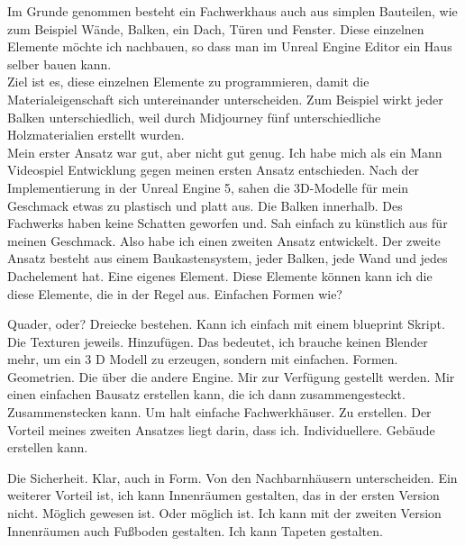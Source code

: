 \documentclass[10pt,a4paper,bibliography=totocnumbered,listof=totocnumbered]{scrartcl}
\begin{document}
Im Grunde genommen besteht ein Fachwerkhaus auch aus simplen Bauteilen, wie zum Beispiel Wände, Balken, ein Dach, Türen und Fenster. Diese einzelnen Elemente möchte ich nachbauen, so dass man im Unreal Engine Editor ein Haus selber bauen kann.
\\
Ziel ist es, diese einzelnen Elemente zu programmieren, damit die Materialeigenschaft sich untereinander unterscheiden. Zum Beispiel wirkt jeder Balken unterschiedlich, weil durch Midjourney fünf unterschiedliche Holzmaterialien erstellt wurden.
\\
Mein erster Ansatz war gut, aber nicht gut genug. Ich habe mich als ein Mann Videospiel Entwicklung gegen meinen ersten Ansatz entschieden. Nach der Implementierung in der Unreal Engine 5, sahen die 3D-Modelle für mein Geschmack etwas zu plastisch und platt aus. Die Balken innerhalb. Des Fachwerks haben keine Schatten geworfen und.  Sah einfach zu künstlich aus für meinen Geschmack. Also habe ich einen zweiten Ansatz entwickelt. Der zweite Ansatz besteht aus einem Baukastensystem, jeder Balken, jede Wand und jedes Dachelement hat.  Eine eigenes Element.  Diese Elemente können kann ich die diese Elemente, die in der Regel aus. Einfachen Formen wie?
 
Quader, oder? Dreiecke bestehen.  Kann ich einfach mit einem blueprint Skript.  Die Texturen jeweils. Hinzufügen.  Das bedeutet, ich brauche keinen Blender mehr, um ein 3 D Modell zu erzeugen, sondern mit einfachen.  Formen. Geometrien. Die über die andere Engine.   Mir zur Verfügung gestellt werden.  Mir einen einfachen Bausatz erstellen kann, die ich dann zusammengesteckt. Zusammenstecken kann. Um halt einfache Fachwerkhäuser. Zu erstellen.  Der Vorteil meines zweiten Ansatzes liegt darin, dass ich. Individuellere. Gebäude erstellen kann.
 
Die Sicherheit. Klar, auch in Form.  Von den Nachbarnhäusern unterscheiden. 	 Ein weiterer Vorteil ist, ich kann Innenräumen gestalten, das in der ersten Version nicht. Möglich gewesen ist. Oder möglich ist.   	 Ich kann mit der zweiten Version Innenräumen auch Fußboden gestalten. Ich kann Tapeten gestalten.
 
\end{document}
